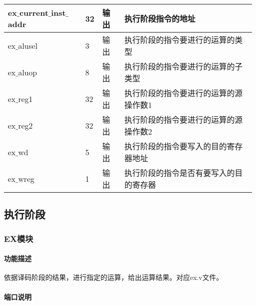 \begin{table}[H]
\begin{tabular}{|l|l|l|l|}
		\hline
		ex$\_$current$\_$inst$\_$addr & 32 & 输出 & 执行阶段指令的地址 \\
		\hline
		ex$\_$alusel & 3 & 输出 & 执行阶段的指令要进行的运算的类型 \\
		\hline
		ex$\_$aluop & 8 & 输出 & 执行阶段的指令要进行的运算的子类型 \\
		\hline
		ex$\_$reg1 & 32 & 输出 & 执行阶段的指令要进行的运算的源操作数1 \\
		\hline
		ex$\_$reg2 & 32 & 输出 & 执行阶段的指令要进行的运算的源操作数2 \\
		\hline
		ex$\_$wd & 5 & 输出 & 执行阶段的指令要写入的目的寄存器地址 \\
		\hline
		ex$\_$wreg & 1 & 输出 & 执行阶段的指令是否有要写入的目的寄存器 \\
		\hline
	\end{tabular}
\end{table}
\subsection{执行阶段}
\subsubsection{EX模块}
\paragraph{功能描述}
\quad

\quad

依据译码阶段的结果，进行指定的运算，给出运算结果。对应ex.v文件。
\paragraph{端口说明}
\quad

